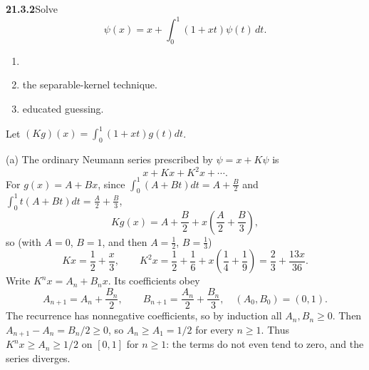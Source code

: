 \par\bigskip
\noindent\textbf{21.3.2}\quad Solve
\[
\psi(x)=x+\int_{0}^{1}(1+xt)\psi(t)\,dt.
\]
\begin{enumerate}
\item[(a)] 
\item[(b)]  the separable-kernel technique.
\item[(c)]  educated guessing.
\end{enumerate}
\solution
Let $(Kg)(x)=\int_0^1(1+xt)g(t)dt$.

(a) The ordinary Neumann series prescribed by $\psi=x+K\psi$ is
\[
x+Kx+K^2x+\cdots.
\]
For $g(x)=A+Bx$, since $\int_0^1(A+Bt)dt=A+\frac B2$ and
$\int_0^1t(A+Bt)dt=\frac A2+\frac B3$,
\[
Kg(x)=A+\frac B2+x\left(\frac A2+\frac B3\right),
\]
so (with $A=0$, $B=1$, and then $A=\frac12$, $B=\frac13$)
\[
Kx=\frac12+\frac x3,\qquad
K^2x=\frac12+\frac16+x\left(\frac14+\frac19\right)
=\frac23+\frac{13x}{36}.
\]
Write $K^nx=A_n+B_nx$. Its coefficients obey
\[
A_{n+1}=A_n+\frac{B_n}{2},\qquad
B_{n+1}=\frac{A_n}{2}+\frac{B_n}{3},
\quad (A_0,B_0)=(0,1).
\]
The recurrence has nonnegative coefficients, so by induction all
$A_n,B_n\ge0$. Then $A_{n+1}-A_n=B_n/2\ge0$, so $A_n\ge A_1=1/2$
for every $n\ge1$. Thus $K^nx\ge A_n\ge1/2$ on $[0,1]$ for $n\ge1$:
the terms do not even tend to zero, and the series diverges.


